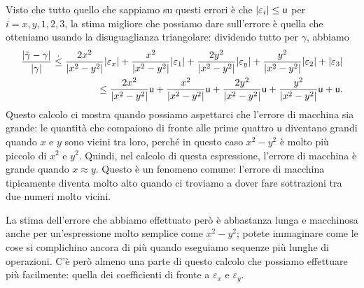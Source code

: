 \documentclass[a4paper]{report}
\DeclarePairedDelimiter{\abs}{\lvert}{\rvert}
\theoremstyle{definiton}
\theoremstyle{remark}
\begin{document}
Visto che tutto quello che sappiamo su questi errori è che $\abs{\varepsilon_i} \leq \mathsf{u}$ per $i=x,y,1,2,3$, la stima migliore che possiamo dare sull'errore è quella che otteniamo usando la disuguaglianza triangolare: dividendo tutto per $\gamma$, abbiamo
\begin{align}
    \frac{\abs{\tilde{\gamma}-\gamma}}{\abs{\gamma}} \stackrel{.}{\leq} \frac{2x^2}{\abs{x^2-y^2}} \abs{\varepsilon_x} + \frac{x^2}{\abs{x^2-y^2}}\abs{\varepsilon_1} + \frac{2y^2}{\abs{x^2-y^2}} \abs{\varepsilon_y} + \frac{y^2}{\abs{x^2-y^2}} \abs{\varepsilon_2} + \abs{\varepsilon_3} \nonumber\\
    \leq \frac{2x^2}{\abs{x^2-y^2}} \mathsf{u} + \frac{x^2}{\abs{x^2-y^2}} \mathsf{u} + \frac{2y^2}{\abs{x^2-y^2}} \mathsf{u} + \frac{y^2}{\abs{x^2-y^2}} \mathsf{u} + \mathsf{u}. \label{esempiox2y2}
\end{align}
Questo calcolo ci mostra quando possiamo aspettarci che l'errore di macchina sia grande: le quantità che compaiono di fronte alle prime quattro $\mathsf{u}$ diventano grandi quando $x$ e $y$ sono vicini tra loro, perché in questo caso $x^2-y^2$ è molto più piccolo di $x^2$ e $y^2$. Quindi, nel calcolo di questa espressione, l'errore di macchina è grande quando $x\approx y$. Questo è un fenomeno comune: l'errore di macchina tipicamente diventa molto alto quando ci troviamo a dover fare sottrazioni tra due numeri molto vicini.

La stima dell'errore che abbiamo effettuato però è abbastanza lunga e macchinosa anche per un'espressione molto semplice come $x^2-y^2$; potete immaginare come le cose si complichino ancora di più quando eseguiamo sequenze più lunghe di operazioni. C'è però almeno una parte di questo calcolo che possiamo effettuare più facilmente: quella dei coefficienti di fronte a $\varepsilon_x$ e $\varepsilon_y$.
\end{document}
